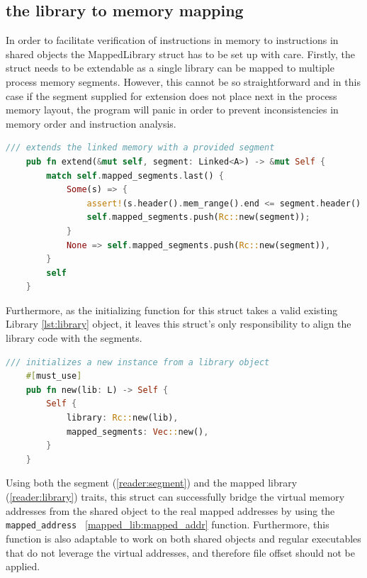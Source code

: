 \subsection{the library to memory mapping}

In order to facilitate verification of instructions in memory to instructions in shared objects the MappedLibrary struct has to be set up with care.
Firstly, the struct needs to be extendable as a single library can be mapped to multiple process memory segments.
However, this cannot be so straightforward and in this case if the segment supplied for extension does not place next in the process memory layout, the program will panic in order to prevent inconsistencies in memory order and instruction analysis.
\begin{lstlisting}[caption=\label{mapped_lib:extend}"The extend function for the MappedLibrary struct", language=Rust, breaklines=true]
/// extends the linked memory with a provided segment
    pub fn extend(&mut self, segment: Linked<A>) -> &mut Self {
        match self.mapped_segments.last() {
            Some(s) => {
                assert!(s.header().mem_range().end <= segment.header().mem_range().start);
                self.mapped_segments.push(Rc::new(segment));
            }
            None => self.mapped_segments.push(Rc::new(segment)),
        }
        self
    }
\end{lstlisting}
Furthermore, as the initializing function for this struct takes a valid existing Library \autoref{lst:library} object, it leaves this struct's only responsibility to align the library code with the segments.
\begin{lstlisting}[caption=\label{mapped_lib:new}"The creator function for the MappedLibrary struct", language=Rust, breaklines=true]
 /// initializes a new instance from a library object
    #[must_use]
    pub fn new(lib: L) -> Self {
        Self {
            library: Rc::new(lib),
            mapped_segments: Vec::new(),
        }
    }
\end{lstlisting}

Using both the segment (\autoref{reader:segment}) and the mapped library (\autoref{reader:library}) traits, this struct can successfully bridge the virtual memory addresses from the shared object to the real mapped addresses by using the \verb| mapped_address | \autoref{mapped_lib:mapped_addr} function.
Furthermore, this function is also adaptable to work on both shared objects and regular executables that do not leverage the virtual addresses, and therefore file offset should not be applied.

